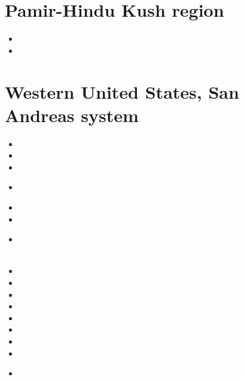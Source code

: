 \section{Pamir-Hindu Kush region}

\begin{small}
\begin{itemize}
\item[\twothousandseven]
\item[\twothousandsixteen]
\end{itemize}
\end{small}

\section{Western United States, San Andreas system}

\begin{small}
\begin{itemize}
\item[\nineteeneightyseven]
\item[\nineteenninetytwo]
\item[\nineteenninetyeight]
\item[\twothousand]
\\ 
\item[\twothousandthree]
\item[\twothousandfour]
\item[\twothousandsix]
 \\
 \\
\item[\twothousandeight]
\item[\twothousandnine]
\item[\twothousandtwelve]
\item[\twothousandthirteen]
\item[\twothousandseventeen]
\item[\twothousandeighteen]
\item[\twothousandtwenty]
\item[\twothousandtwentyone]
\item[\twothousandtwentytwo]
 \\
\end{itemize}
\end{small}

